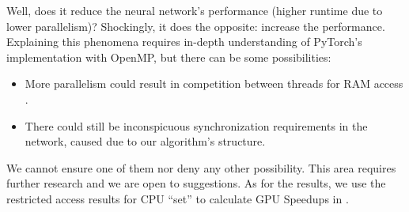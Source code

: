 Well, does it reduce the neural network's performance (higher runtime due to lower parallelism)? Shockingly, it does the opposite: increase the performance. Explaining this phenomena requires in-depth understanding of PyTorch's implementation with OpenMP, but there can be some possibilities:
\begin{itemize}
    \item More parallelism could result in competition between threads for RAM access \cite[Section~2.1]{IssuesMP}.
    \item There could still be inconspicuous synchronization requirements in the network, caused due to our algorithm's structure.
\end{itemize}
We cannot ensure one of them nor deny any other possibility. This area requires further research and we are open to suggestions. As for the results, we use the restricted access results for CPU ``set'' to calculate GPU Speedups in .